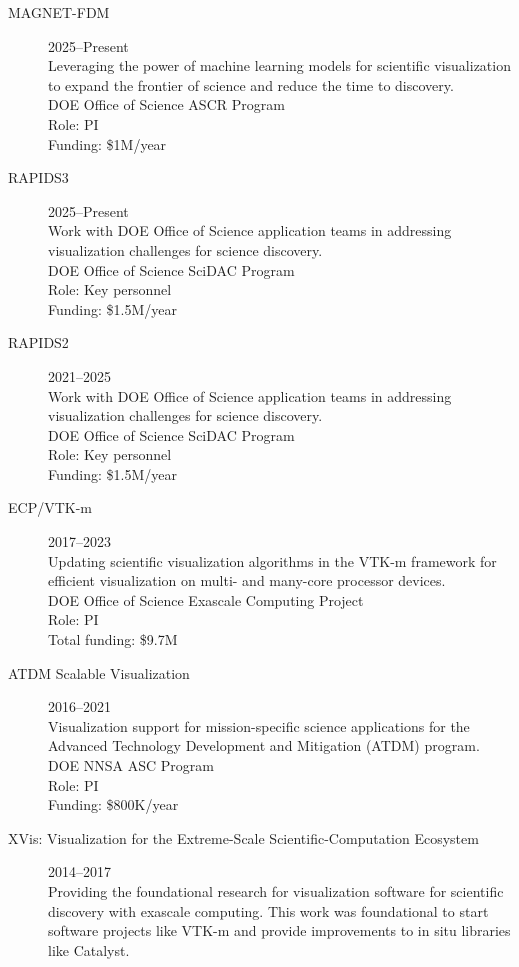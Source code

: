 \documentclass{article}
\begin{document}
\begin{description}
\item[MAGNET-FDM]\hfill 2025--Present\\
  Leveraging the power of machine learning models for scientific visualization to expand the frontier of science and reduce the time to discovery.\\
  DOE Office of Science ASCR Program\\
  Role: PI\\
  Funding: \$1M/year
\item[RAPIDS3]\hfill 2025--Present\\
  Work with DOE Office of Science application teams in addressing visualization challenges for science discovery.\\
  DOE Office of Science SciDAC Program\\
  Role: Key personnel\\
  Funding: \$1.5M/year
\item[RAPIDS2]\hfill 2021--2025\\
  Work with DOE Office of Science application teams in addressing visualization challenges for science discovery.\\
  DOE Office of Science SciDAC Program\\
  Role: Key personnel\\
  Funding: \$1.5M/year
\item[ECP/VTK-m]\hfill 2017--2023\\
  Updating scientific visualization algorithms in the VTK-m framework for efficient visualization on multi- and many-core processor devices.\\
  DOE Office of Science Exascale Computing Project\\
  Role: PI\\
  Total funding: \$9.7M %
\item[ATDM Scalable Visualization]\hfill 2016--2021\\
  Visualization support for mission-specific science applications for the Advanced Technology Development and Mitigation (ATDM) program.\\
  DOE NNSA ASC Program\\
  Role: PI\\
  Funding: \$800K/year
\item[XVis: Visualization for the Extreme-Scale Scientific-Computation Ecosystem]\hfill 2014--2017\\
  Providing the foundational research for visualization software for scientific discovery with exascale computing. This work was foundational to start software projects like \mbox{VTK-m} and provide improvements to in situ libraries like Catalyst. \\

\end{description}
\end{document}
